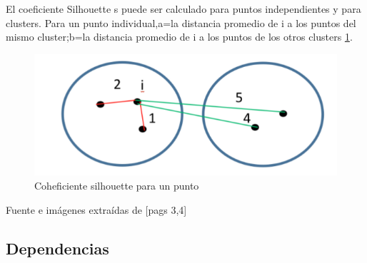 \documentclass[10pt,a4paper]{article}
\begin{document}
El coeficiente Silhouette s puede ser calculado para puntos independientes y para clusters. Para un punto individual,a=la distancia promedio de i a los puntos del mismo cluster;b=la distancia promedio de i a los puntos de los otros clusters \ref{fig:coeficiente}.

\begin{figure}[H]
	\centering
	\includegraphics[scale=0.50]{./img/silhouette01.png}%
	\caption[Coeficiente silhouette para un punto i]{Coheficiente silhouette para un punto}
	\label{fig:coeficiente}
\end{figure}

Fuente e imágenes extraídas de \citep{MOA}[pags 3,4]

\newpage

\subsection*{Dependencias}
\end{document}
